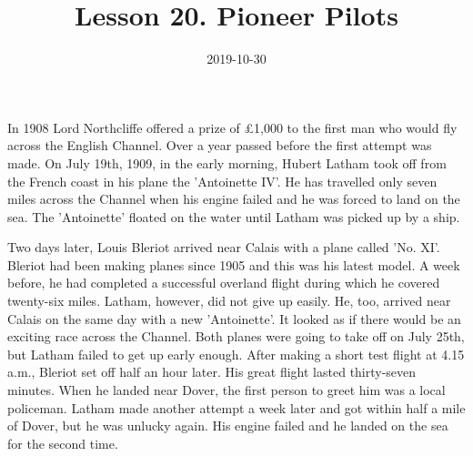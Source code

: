 \documentclass[a4paper,12pt]{article}
\title{Lesson 20. Pioneer Pilots}
\author{}
\date{2019-10-30}
\begin{document}
\maketitle
In 1908 Lord Northcliffe offered a prize of \pounds 1,000 to the first man who would fly across the English Channel. Over a year passed before the first attempt was made. On July 19th, 1909, in the early morning, Hubert Latham took off from the French coast in his plane the 'Antoinette IV'. He has travelled only seven miles across the Channel when his engine failed and he was forced to land on the sea. The 'Antoinette' floated on the water until Latham was picked up by a ship.

Two days later, Louis Bleriot arrived near Calais with a plane called 'No. XI'. Bleriot had been making planes since 1905 and this was his latest model. A week before, he had completed a successful overland flight during which he covered twenty-six miles. Latham, however, did not give up easily. He, too, arrived near Calais on the same day with a new 'Antoinette'. It looked as if there would be an exciting race across the Channel. Both planes were going to take off on July 25th, but Latham failed to get up early enough. After making a short test flight at 4.15 a.m., Bleriot set off half an hour later. His great flight lasted thirty-seven minutes. When he landed near Dover, the first person to greet him was a local policeman. Latham made another attempt a week later and got within half a mile of Dover, but he was unlucky again. His engine failed and he landed on the sea for the second time.
\end{document}
